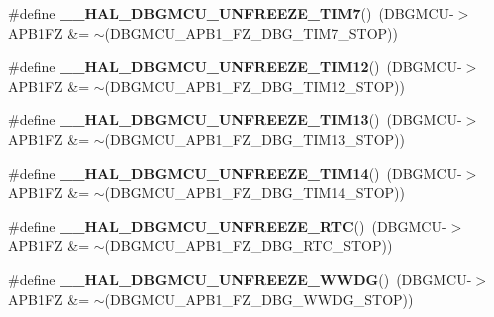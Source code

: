\begin{DoxyCompactItemize}
\item 
\#define {\bfseries \+\_\+\+\_\+\+H\+A\+L\+\_\+\+D\+B\+G\+M\+C\+U\+\_\+\+U\+N\+F\+R\+E\+E\+Z\+E\+\_\+\+T\+I\+M7}()~(D\+B\+G\+M\+CU-\/$>$A\+P\+B1\+FZ \&= $\sim$(D\+B\+G\+M\+C\+U\+\_\+\+A\+P\+B1\+\_\+\+F\+Z\+\_\+\+D\+B\+G\+\_\+\+T\+I\+M7\+\_\+\+S\+T\+OP))\hypertarget{group___h_a_l___exported___macros_ga4a6c5081b976583921ac5d140e15bb85}{}\label{group___h_a_l___exported___macros_ga4a6c5081b976583921ac5d140e15bb85}

\item 
\#define {\bfseries \+\_\+\+\_\+\+H\+A\+L\+\_\+\+D\+B\+G\+M\+C\+U\+\_\+\+U\+N\+F\+R\+E\+E\+Z\+E\+\_\+\+T\+I\+M12}()~(D\+B\+G\+M\+CU-\/$>$A\+P\+B1\+FZ \&= $\sim$(D\+B\+G\+M\+C\+U\+\_\+\+A\+P\+B1\+\_\+\+F\+Z\+\_\+\+D\+B\+G\+\_\+\+T\+I\+M12\+\_\+\+S\+T\+OP))\hypertarget{group___h_a_l___exported___macros_gaa8e882be8db24537679bc0d4a129f448}{}\label{group___h_a_l___exported___macros_gaa8e882be8db24537679bc0d4a129f448}

\item 
\#define {\bfseries \+\_\+\+\_\+\+H\+A\+L\+\_\+\+D\+B\+G\+M\+C\+U\+\_\+\+U\+N\+F\+R\+E\+E\+Z\+E\+\_\+\+T\+I\+M13}()~(D\+B\+G\+M\+CU-\/$>$A\+P\+B1\+FZ \&= $\sim$(D\+B\+G\+M\+C\+U\+\_\+\+A\+P\+B1\+\_\+\+F\+Z\+\_\+\+D\+B\+G\+\_\+\+T\+I\+M13\+\_\+\+S\+T\+OP))\hypertarget{group___h_a_l___exported___macros_ga00b605f660d43ab1b833926dabe352fe}{}\label{group___h_a_l___exported___macros_ga00b605f660d43ab1b833926dabe352fe}

\item 
\#define {\bfseries \+\_\+\+\_\+\+H\+A\+L\+\_\+\+D\+B\+G\+M\+C\+U\+\_\+\+U\+N\+F\+R\+E\+E\+Z\+E\+\_\+\+T\+I\+M14}()~(D\+B\+G\+M\+CU-\/$>$A\+P\+B1\+FZ \&= $\sim$(D\+B\+G\+M\+C\+U\+\_\+\+A\+P\+B1\+\_\+\+F\+Z\+\_\+\+D\+B\+G\+\_\+\+T\+I\+M14\+\_\+\+S\+T\+OP))\hypertarget{group___h_a_l___exported___macros_gaa62a0abc610b769d15fd9d20bdc14cd7}{}\label{group___h_a_l___exported___macros_gaa62a0abc610b769d15fd9d20bdc14cd7}

\item 
\#define {\bfseries \+\_\+\+\_\+\+H\+A\+L\+\_\+\+D\+B\+G\+M\+C\+U\+\_\+\+U\+N\+F\+R\+E\+E\+Z\+E\+\_\+\+R\+TC}()~(D\+B\+G\+M\+CU-\/$>$A\+P\+B1\+FZ \&= $\sim$(D\+B\+G\+M\+C\+U\+\_\+\+A\+P\+B1\+\_\+\+F\+Z\+\_\+\+D\+B\+G\+\_\+\+R\+T\+C\+\_\+\+S\+T\+OP))\hypertarget{group___h_a_l___exported___macros_ga3d85d5cda1979c7df426634a1d3d7d35}{}\label{group___h_a_l___exported___macros_ga3d85d5cda1979c7df426634a1d3d7d35}

\item 
\#define {\bfseries \+\_\+\+\_\+\+H\+A\+L\+\_\+\+D\+B\+G\+M\+C\+U\+\_\+\+U\+N\+F\+R\+E\+E\+Z\+E\+\_\+\+W\+W\+DG}()~(D\+B\+G\+M\+CU-\/$>$A\+P\+B1\+FZ \&= $\sim$(D\+B\+G\+M\+C\+U\+\_\+\+A\+P\+B1\+\_\+\+F\+Z\+\_\+\+D\+B\+G\+\_\+\+W\+W\+D\+G\+\_\+\+S\+T\+OP))\hypertarget{group___h_a_l___exported___macros_gaa14c8a2e8911976b8c8ce6ca278372a2}{}\label{group___h_a_l___exported___macros_gaa14c8a2e8911976b8c8ce6ca278372a2}


\end{DoxyCompactItemize}
